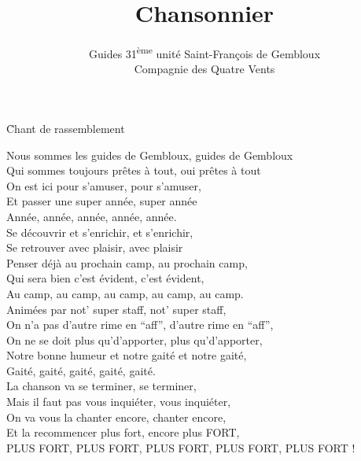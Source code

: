 \documentclass{novel}
\title     {Chansonnier}
\subtitle  {Guides 31\textsuperscript{ème} unité Saint-François de Gembloux\\ Compagnie des Quatre Vents}
\author    {}
\begin{document}

\renewcommand{\cftchapleader}{\cftdotfill{\cftdotsep}}
\toc


\h*{Chant de rassemblement}
\setcounter{page}{1}
\large

Nous sommes les guides de Gembloux, guides de Gembloux\\
Qui sommes toujours prêtes à tout, oui prêtes à tout\\
On est ici pour s’amuser, pour s’amuser,\\
Et passer une super année, super année\\
Année, année, année, année, année.\\

Se découvrir et s’enrichir, et s’enrichir,\\
Se retrouver avec plaisir, avec plaisir\\
Penser déjà au prochain camp, au prochain camp,\\
Qui sera bien c’est évident, c’est évident,\\
Au camp, au camp, au camp, au camp, au camp.\\


Animées par not’ super staff, not’ super staff,\\
On n’a pas d’autre rime en “aff”, d’autre rime en “aff”,\\
On ne se doit plus qu’d’apporter, plus qu’d’apporter,\\
Notre bonne humeur et notre gaité et notre gaité,\\
Gaité, gaité, gaité, gaité, gaité.\\


La chanson va se terminer, se terminer,\\
Mais il faut pas vous inquiéter, vous inquiéter,\\
On va vous la chanter encore, chanter encore,\\
Et la recommencer plus fort, encore plus FORT,\\
PLUS FORT, PLUS FORT, PLUS FORT, PLUS FORT, PLUS FORT !
\end{document}
